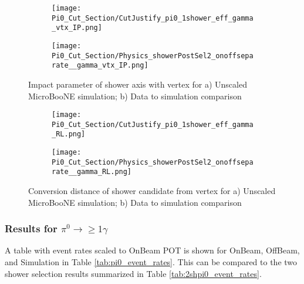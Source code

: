\begin{figure}[H]
\centering
  \begin{subfigure}[t]{0.35\textwidth}
    \centering
\texttt{[image: Pi0\_Cut\_Section/CutJustify\_pi0\_1shower\_eff\_gamma\_vtx\_IP.png]}
  \caption{ }
  \end{subfigure} 
  \hspace{30mm}
  \begin{subfigure}[t]{0.35\textwidth}
    \centering
\texttt{[image: Pi0\_Cut\_Section/Physics\_showerPostSel2\_onoffseparate\_\_gamma\_vtx\_IP.png]}
  \caption{ }
  \end{subfigure} 
\caption{ Impact parameter of shower axis with vertex for a) Unscaled MicroBooNE simulation; b) Data to simulation comparison }
\label{fig:cutjust_pi0_1shower_IP}
\end{figure}

\begin{figure}[H]
\centering
  \begin{subfigure}[t]{0.35\textwidth}
    \centering
\texttt{[image: Pi0\_Cut\_Section/CutJustify\_pi0\_1shower\_eff\_gamma\_RL.png]}
  \caption{ }
  \end{subfigure} 
  \hspace{30mm}
  \begin{subfigure}[t]{0.35\textwidth}
    \centering
\texttt{[image: Pi0\_Cut\_Section/Physics\_showerPostSel2\_onoffseparate\_\_gamma\_RL.png]}
  \caption{ }
  \end{subfigure} 
\caption{ Conversion distance of shower candidate from vertex for a) Unscaled MicroBooNE simulation; b) Data to simulation comparison }
\label{fig:cutjust_pi0_1shower_RL}
\end{figure}



\subsubsection{Results for $\pi^0\rightarrow \geq 1\gamma$}
\par A table with event rates scaled to OnBeam POT is shown for OnBeam, OffBeam, and Simulation in Table \ref{tab:pi0_event_rates}. This can be compared to the two shower selection results summarized in Table \ref{tab:2shpi0_event_rates}.  

